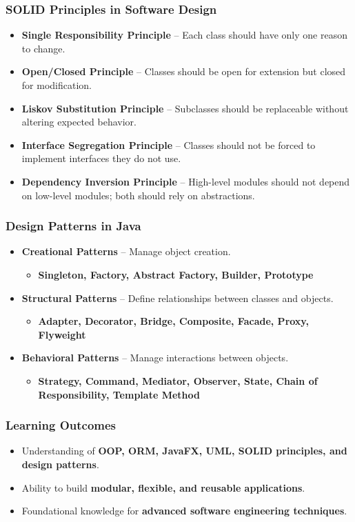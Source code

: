 \documentclass[aspectratio=169, table]{beamer}
\begin{document}
\begin{frame}[fragile]
	\frametitle{SOLID Principles in Software Design}
	
	\begin{itemize}
		\item \textbf{Single Responsibility Principle} – Each class should have only one reason to change.
		\item \textbf{Open/Closed Principle} – Classes should be open for extension but closed for modification.
		\item \textbf{Liskov Substitution Principle} – Subclasses should be replaceable without altering expected behavior.
		\item \textbf{Interface Segregation Principle} – Classes should not be forced to implement interfaces they do not use.
		\item \textbf{Dependency Inversion Principle} – High-level modules should not depend on low-level modules; both should rely on abstractions.
	\end{itemize}
\end{frame}

\begin{frame}[fragile]
	\frametitle{Design Patterns in Java}
	
	\begin{itemize}
		\item \textbf{Creational Patterns} – Manage object creation.
		\begin{itemize}
			\item \textbf{Singleton, Factory, Abstract Factory, Builder, Prototype}
		\end{itemize}
		\item \textbf{Structural Patterns} – Define relationships between classes and objects.
		\begin{itemize}
			\item \textbf{Adapter, Decorator, Bridge, Composite, Facade, Proxy, Flyweight}
		\end{itemize}
		\item \textbf{Behavioral Patterns} – Manage interactions between objects.
		\begin{itemize}
			\item \textbf{Strategy, Command, Mediator, Observer, State, Chain of Responsibility, Template Method}
		\end{itemize}
	\end{itemize}
\end{frame}

\begin{frame}
	\frametitle{Learning Outcomes}
	
	\begin{itemize}
		\item Understanding of \textbf{OOP, ORM, JavaFX, UML, SOLID principles, and design patterns}.
		\item Ability to build \textbf{modular, flexible, and reusable applications}.
		\item Foundational knowledge for \textbf{advanced software engineering techniques}.
	\end{itemize}
\end{frame}
\end{document}
